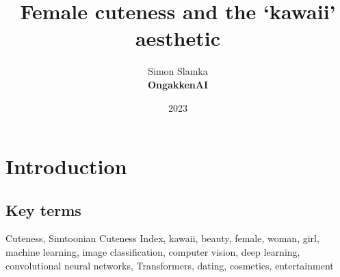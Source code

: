 \documentclass{article}
\title{Female cuteness and the `kawaii' aesthetic}
\author{Simon Slamka\\
\small\textbf{OngakkenAI}}
\date{2023}
\begin{document}
\maketitle

\begin{abstract}

\end{abstract}

\section{Introduction}
\subsection{Key terms}
Cuteness, Simtoonian Cuteness Index, kawaii, beauty, female, woman, girl, machine learning, image classification, computer vision, deep learning, convolutional neural networks, Transformers, dating, cosmetics, entertainment
\end{document}
